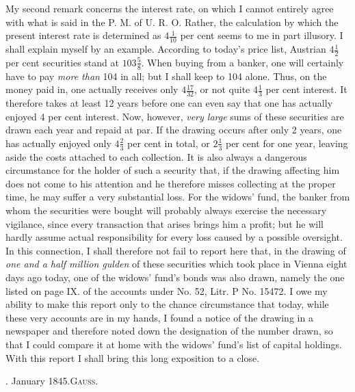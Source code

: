 My second remark concerns the interest rate, on which I cannot entirely agree with what is said in the P. M. of U. R. O. Rather, the calculation by which the present interest rate is determined as \(4\tfrac1{10}\) per cent seems to me in part illusory. I shall explain myself by an example. According to today's price list, Austrian \(4\tfrac12\) per cent securities stand at \(103\tfrac58\). When buying from a banker, one will certainly have to pay \textit{more than} 104 in all; but I shall keep to 104 alone. Thus, on the money paid in, one actually receives only \(4\tfrac{17}{32}\), or not quite \(4\tfrac13\) per cent interest. It therefore takes at least 12 years before one can even say that one has actually enjoyed 4 per cent interest. Now, however, \textit{very large} sums of these securities are drawn each year and repaid at par. If the drawing occurs after only 2 years, one has actually enjoyed only \(4\tfrac23\) per cent in total, or \(2\tfrac13\) per cent for one year, leaving aside the costs attached to each collection. It is also always a dangerous circumstance for the holder of such a security that, if the drawing affecting him does not come to his attention and he therefore misses collecting at the proper time, he may suffer a very substantial loss. For the widows' fund, the banker from whom the securities were bought will probably always exercise the necessary vigilance, since every transaction that arises brings him a profit; but he will hardly assume actual responsibility for every loss caused by a possible oversight. In this connection, I shall therefore not fail to report here that, in the drawing of \textit{one and a half million gulden} of these securities which took place in Vienna eight days ago today, one of the widows' fund's bonds was also drawn, namely the one listed on page IX. of the accounts under No. 52, Litr. P No. 15472. I owe my ability to make this report only to the chance circumstance that today, while these very accounts are in my hands, I found a notice of the drawing in a newspaper and therefore noted down the designation of the number drawn, so that I could compare it at home with the widows' fund's list of capital holdings. With this report I shall bring this long exposition to a close.

. January 1845.\hfill\textsc{Gauss.}

